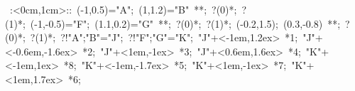 
%


\hbox{
\xy    <2cm,0cm>:<0cm,1cm>::
       (-1,0.5)="A"; (1,1.2)="B" **\dir{-}; ?(0)*\dir{<}; ?(1)*\dir{>};
       (-1,-0.5)="F"; (1.1,0.2)="G" **\dir{-}; ?(0)*\dir{<}; ?(1)*\dir{>};
       (-0.2,1.5); (0.3,-0.8) **\dir{-}; ?(0)*\dir{<}; ?(1)*\dir{>};
       ?!{"A";"B"}="J";  ?!{"F";"G"}="K";
       "J"+<-1em,1.2ex> *{1};
       "J"+<-0.6em,-1.6ex> *{2};
       "J"+<1em,-1ex> *{3};
       "J"+<0.6em,1.6ex> *{4};
       "K"+<-1em,1ex> *{8};
       "K"+<-1em,-1.7ex> *{5};
       "K"+<1em,-1ex> *{7};
       "K"+<1em,1.7ex> *{6};
\endxy}


